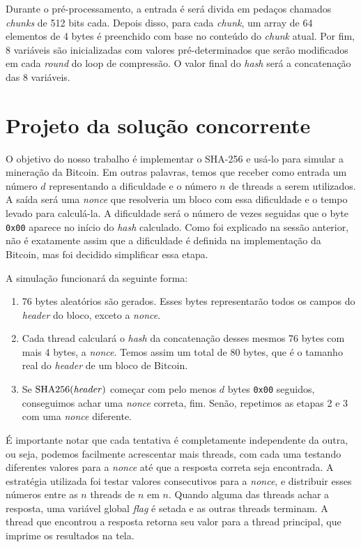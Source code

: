 \documentclass[12pt]{article}
\DeclareMathOperator{\sha}{SHA256}
\begin{document}
Durante o pré-processamento,
a entrada é será divida em
pedaços chamados \textit{chunks} de 512 bits cada.
Depois disso, para cada \textit{chunk},
um array de 64 elementos de 4 bytes é
preenchido com base no conteúdo do \textit{chunk} atual.
Por fim, 8 variáveis são inicializadas com valores pré-determinados
que serão modificados em cada \textit{round} do loop de compressão.
O valor final do \textit{hash} será a concatenação das 8 variáveis.

\section{Projeto da solução concorrente}
O objetivo do nosso trabalho é
implementar o SHA-256 e
usá-lo para simular a mineração da Bitcoin.
Em outras palavras,
temos que receber como entrada
um número $d$ representando a dificuldade e
o número $n$ de threads a serem utilizados.
A saída será uma \textit{nonce} que
resolveria um bloco com essa dificuldade e
o tempo levado para calculá-la.
A dificuldade será o número de vezes seguidas 
que o byte \texttt{0x00} aparece no
início do \textit{hash} calculado.
Como foi explicado na sessão anterior,
não é exatamente assim que a dificuldade é definida
na implementação da Bitcoin,
mas foi decidido simplificar essa etapa.

A simulação funcionará da seguinte forma:
\begin{enumerate}
	\item 76 bytes aleatórios são gerados.
		Esses bytes representarão todos os campos
		do \textit{header} do bloco,
		exceto a \textit{nonce}.
	\item Cada thread calculará o \textit{hash} da concatenação
		desses mesmos 76 bytes com mais 4 bytes, a \textit{nonce}.
		Temos assim um total de 80 bytes,
		que é o tamanho real do \textit{header} de
		um bloco de Bitcoin.
	\item Se $\sha(\text{\textit{header}})$
		começar com pelo menos $d$ bytes \texttt{0x00} seguidos,
		conseguimos achar uma \textit{nonce} correta, fim.
		Senão, repetimos as etapas 2 e 3
		com uma \textit{nonce} diferente.
\end{enumerate}

É importante notar que cada tentativa
é completamente independente da outra, ou seja,
podemos facilmente acrescentar mais threads,
com cada uma testando diferentes valores para a \textit{nonce}
até que a resposta correta seja encontrada.
A estratégia utilizada foi
testar valores consecutivos para a \textit{nonce},
e distribuir esses números
entre as $n$ threads de $n$ em $n$.
Quando alguma das threads achar a resposta,
uma variável global \textit{flag} é setada
e as outras threads terminam.
A thread que encontrou a resposta
retorna seu valor para a thread principal,
que imprime os resultados na tela.
\end{document}
